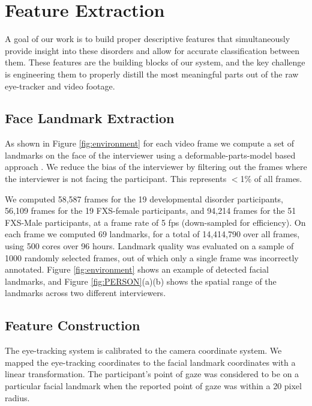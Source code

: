 \documentclass[10pt,twocolumn,letterpaper]{article}
\begin{document}
\section{Feature Extraction}
\label{sec:feature_extraction}
A goal of our work is to build proper descriptive features that simultaneously provide insight into these disorders and allow for accurate classification between them. These features are the building blocks of our system, and the key challenge is engineering them to properly distill the most meaningful parts out of the raw eye-tracker and video footage.  

\subsection{Face Landmark Extraction}
As shown in Figure \ref{fig:environment} for each video frame we compute a set of landmarks on the face of the interviewer using a deformable-parts-model based approach \cite{dpmface}. We reduce the bias of the interviewer by filtering out the frames where the interviewer is not facing the participant. This represents $<$1\% of all frames.

We computed 58,587 frames for the 19 developmental disorder participants, 56,109 frames for the 19 FXS-female participants, and 94,214 frames for the 51 FXS-Male participants, at a frame rate of 5 fps (down-sampled for efficiency). On each frame we computed 69 landmarks, for a total of 14,414,790 over all frames, using 500 cores over 96 hours. Landmark quality was evaluated on a sample of 1000 randomly selected frames, out of which only a single frame was incorrectly annotated. Figure \ref{fig:environment} shows an example of detected facial landmarks, and Figure \ref{fig:PERSON}(a)(b) shows the spatial range of the landmarks across two different interviewers. 
 
\subsection{Feature Construction}
\label{ssec:feature_construction}
The eye-tracking system is calibrated to the camera coordinate system. We mapped the eye-tracking coordinates to the facial landmark coordinates with a linear transformation. The participant's point of gaze was considered to be on a particular facial landmark when the reported point of gaze was within a 20 pixel radius. %
\end{document}
